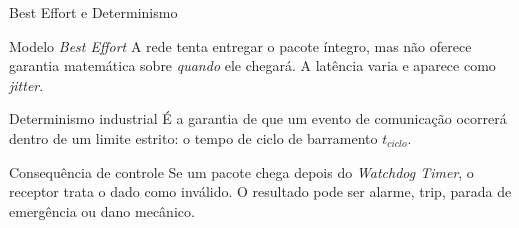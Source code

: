 \documentclass[10pt, aspectratio=169]{beamer}
\begin{document}
\begin{frame}{Best Effort e Determinismo}
    \small
    \begin{block}{Modelo \textit{Best Effort}}
        A rede tenta entregar o pacote \'integro, mas n\~ao oferece garantia matem\'atica sobre \textit{quando} ele chegar\'a. A lat\^encia varia e aparece como \textit{jitter}.
    \end{block}

    \begin{block}{Determinismo industrial}
        \'E a garantia de que um evento de comunica\c{c}\~ao ocorrer\'a dentro de um limite estrito: o tempo de ciclo de barramento \(t_{ciclo}\).
    \end{block}

    \begin{block}{Consequ\^encia de controle}
        Se um pacote chega depois do \textit{Watchdog Timer}, o receptor trata o dado como inv\'alido. O resultado pode ser alarme, trip, parada de emerg\^encia ou dano mec\^anico.
    \end{block}
\end{frame}
\end{document}
